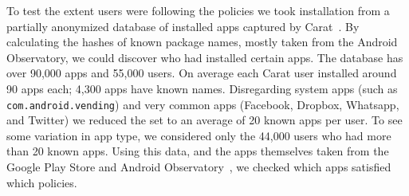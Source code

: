 \documentclass[thesis.tex]{subfiles}
\begin{document}
To test the extent users were following the policies we took installation from a partially anonymized database of installed apps captured by Carat~\cite{oliner_carat:_2013}.
By calculating the hashes of known package names, mostly taken from the Android Observatory, we could discover who had installed certain apps.
The database has over 90,000 apps and 55,000 users.
On average each Carat user installed around 90 apps each; 4,300 apps have known names.
Disregarding system apps (such as \texttt{com.android.vending}) and very common apps (Facebook, Dropbox, Whatsapp, and Twitter) we reduced the set to an average of 20 known apps per user.
To see some variation in app type, we considered only the 44,000 users who had more than 20 known apps.
Using this data, and the apps themselves taken from the Google Play Store and Android Observatory~\cite{barrera_understanding_2012}, we checked which apps satisfied which policies.
\end{document}
